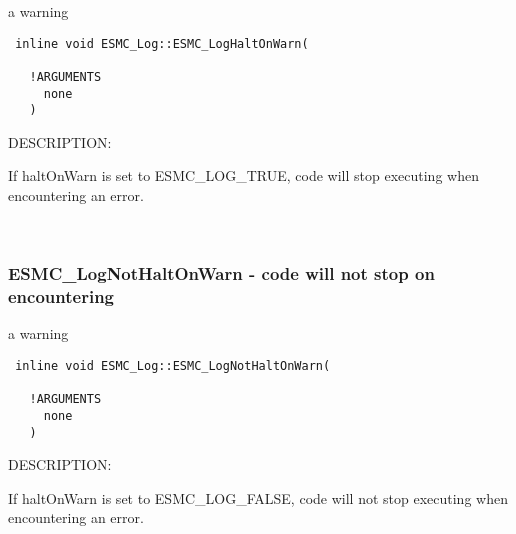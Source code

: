    a warning
  
\begin{verbatim} 
 inline void ESMC_Log::ESMC_LogHaltOnWarn(
 
   !ARGUMENTS
     none
   )
 \end{verbatim}
{\sf DESCRIPTION:\\ }


   If haltOnWarn is set to ESMC\_LOG\_TRUE, code will stop executing when
   encountering an error.
    
 
\mbox{}\hrulefill\ 
 

  \subsubsection [ESMC\_LogNotHaltOnWarn] {ESMC\_LogNotHaltOnWarn - code will not stop on encountering}


   a warning
  
\begin{verbatim} 
 inline void ESMC_Log::ESMC_LogNotHaltOnWarn(
 
   !ARGUMENTS
     none
   )
 \end{verbatim}
{\sf DESCRIPTION:\\ }


   If haltOnWarn is set to ESMC\_LOG\_FALSE, code will not stop executing when
   encountering an error.
   
